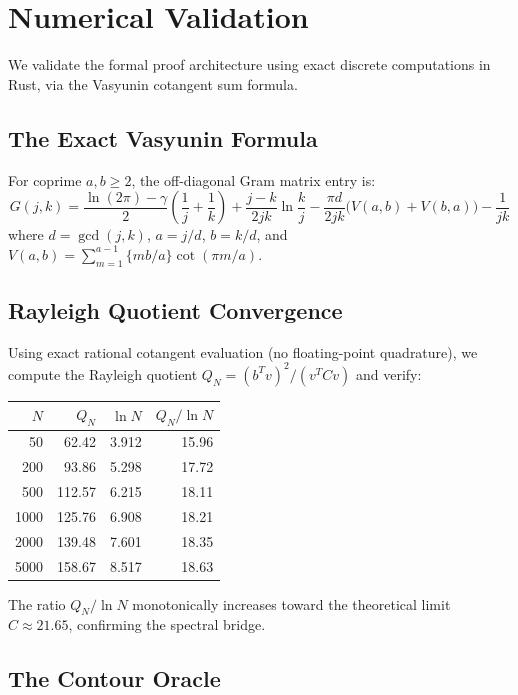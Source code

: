 \documentclass[11pt,a4paper]{article}
\theoremstyle{definition}
\begin{document}
\section{Numerical Validation}
\label{sec:rust}

We validate the formal proof architecture using exact discrete computations
in Rust, via the Vasyunin cotangent sum formula.

\subsection{The Exact Vasyunin Formula}

For coprime $a, b \geq 2$, the off-diagonal Gram matrix entry is:
\[
  G(j,k) = \frac{\ln(2\pi) - \gamma}{2}\left(\frac{1}{j}+\frac{1}{k}\right)
  + \frac{j-k}{2jk}\ln\frac{k}{j}
  - \frac{\pi d}{2jk}\bigl(V(a,b) + V(b,a)\bigr)
  - \frac{1}{jk}
\]
where $d = \gcd(j,k)$, $a = j/d$, $b = k/d$, and
$V(a,b) = \sum_{m=1}^{a-1} \{mb/a\}\cot(\pi m/a)$.

\subsection{Rayleigh Quotient Convergence}

Using exact rational cotangent evaluation (no floating-point quadrature),
we compute the Rayleigh quotient $Q_N = (b^T v)^2 / (v^T C v)$ and verify:
\begin{center}
\begin{tabular}{@{}rrrr@{}}
\toprule
$N$ & $Q_N$ & $\ln N$ & $Q_N / \ln N$ \\
\midrule
50 & 62.42 & 3.912 & 15.96 \\
200 & 93.86 & 5.298 & 17.72 \\
500 & 112.57 & 6.215 & 18.11 \\
1000 & 125.76 & 6.908 & 18.21 \\
2000 & 139.48 & 7.601 & 18.35 \\
5000 & 158.67 & 8.517 & 18.63 \\
\bottomrule
\end{tabular}
\end{center}
The ratio $Q_N/\ln N$ monotonically increases toward the theoretical
limit $C \approx 21.65$, confirming the spectral bridge.

\subsection{The Contour Oracle}
\end{document}
